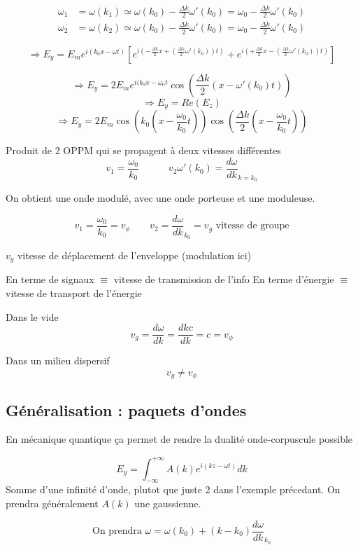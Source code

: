 \documentclass[12pt,a4paper]{report}
\begin{document}
\begin{align*}
	\omega_1 &= \omega (k_1) \simeq \omega(k_0) - \frac{\Delta k}{2} \omega' (k_0) = \omega_0 - \frac{\Delta k}{2} \omega' (k_0)\\
	\omega_2 &= \omega (k_2) \simeq \omega(k_0) - \frac{\Delta k}{2} \omega' (k_0) = \omega_0 - \frac{\Delta k}{2} \omega' (k_0)
\end{align*}

\[
	\Rightarrow E_y = E_m e^{i(k_0 x - \omega t)}  \left[ e^{i(- \frac{\Delta k}{2} x + (\frac{\Delta k}{2} \omega'(k_0))t)} + e^{i(+ \frac{\Delta k}{2} x - (\frac{\Delta k}{2} \omega'(k_0))t)} \right]
\]

\[
	\Rightarrow E_y = 2 E_m e^{i(k_0 x - \omega_0 t} \cos(\frac{\Delta k}{2} (x - \omega'(k_0)t))
\]
\[
	\Rightarrow E_y = Re(E_z)
\]
\[
	\Rightarrow E_y = 2 E_m \cos (k_0(x- \frac{\omega_0}{k_0} t)) \cos(\frac{\Delta k}{2}(x - \frac{\omega_0}{k_0} t))
\]

Produit de 2 OPPM qui se propagent à deux vitesses différentes
\[
	v_1 = \frac{\omega_0}{k_0} \quad \quad \quad v_2  \omega' (k_0) = \frac{d\omega}{dk}_{k = k_0}
\]

On obtient une onde modulé, avec une onde porteuse et une moduleuse.

\[
	v_1 = \frac{\omega_0}{k_0} = v_\phi \quad \quad v_2 = \frac{d\omega}{dk}_{k_0} = v_g \text{ vitesse de groupe}
\]

\(v_g\) vitesse de déplacement de l'enveloppe (modulation ici)

En terme de signaux \(\equiv \) vitesse de transmission de l'info
En terme d'énergie \(\equiv \) vitesse de transport de l'énergie 

Dans le vide 
\[
	v_g = \frac{d\omega}{dk} = \frac{dkc}{dk} = c = v_\phi
\]

Dans un milieu dispersif
\[
	v_g \neq v_\phi
\]

\subsection{Généralisation : paquets d'ondes}

En mécanique quantique ça permet de rendre la dualité onde-corpuscule possible

\[
	E_y = \int_{-\infty}^{+\infty} A(k) e^{i(kz-\omega t)} dk
\]
Somme d'une infinité d'onde, plutot que juste 2 dans l'exemple précedant. On prendra généralement \(A(k)\) une gaussienne.

\[
	\text{On prendra } \omega = \omega(k_0) + (k - k_0) \frac{d\omega}{dk}_{k_0}
\]
\end{document}
